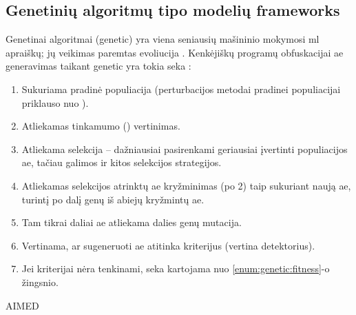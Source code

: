 \subsection{Genetinių algoritmų tipo modelių \glspl{framework}}\label{sec:literature:genetic}

Genetinai algoritmai (\acs{genetic}) yra viena seniausių mašininio mokymosi
\acs{ml} apraiškų; jų veikimas paremtas evoliucija \cite{castroAIMEDEvolvingMalware2019}. Kenkėjiškų
programų obfuskacijai \acs{ae} generavimas taikant \acs{genetic} yra tokia
seka \cite{yusteOptimizationCodeCaves2022}:
\begin{enumerate}
    \item Sukuriama pradinė populiacija (perturbacijos metodai pradinei populiacijai
          priklauso nuo ).
    \item Atliekamas tinkamumo () vertinimas.\label{enum:genetic:fitness}
    \item Atliekama selekcija -- dažniausiai pasirenkami geriausiai įvertinti
          populiacijos \acs{ae}, tačiau galimos ir kitos selekcijos strategijos.
    \item Atliekamas selekcijos atrinktų \acs{ae} kryžminimas (po 2) taip sukuriant naują
          \acs{ae}, turintį po dalį genų iš abiejų kryžmintų \acs{ae}.
    \item Tam tikrai daliai \ac{ae} atliekama dalies genų mutacija.
    \item Vertinama, ar sugeneruoti \acs{ae} atitinka kriterijus (vertina detektorius).
    \item Jei kriterijai nėra tenkinami, seka kartojama nuo \ref{enum:genetic:fitness}-o
          žingsnio.
\end{enumerate}

\begin{describeFramework}{AIMED}{\cite{castroAIMEDEvolvingMalware2019}}
     
\end{describeFramework}

